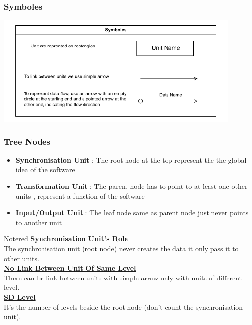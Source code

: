 \subsubsection*{Symboles}

\begin{center}
\includegraphics[width=0.9\textwidth]{Chapters/Diagram/SD/smb.drawio.pdf}
\end{center}

\vspace{0.5cm}

\subsubsection*{Tree Nodes}
\begin{itemize}
    \item \textbf{Synchronisation Unit} : The root node at the top represent the the global idea of the software 
    \item \textbf{Transformation Unit} : The parent node has to point to at least one other units , represent a function of the software
    \item \textbf{Input/Output Unit} : The leaf node same as parent node just never points to another unit
\end{itemize}

\vspace{0.5cm}

\begin{prettyBox}{Note}{red}
\textbf{\underline{Synchronisation Unit's Role}}\\[0.15cm]
The synchronisation unit (root node) never creates the data it only pass it to other units.\\[0.25cm]
\textbf{\underline{No Link Between Unit Of Same Level}}\\[0.15cm]
There can be link between units with simple arrow only with units of different level.\\[0.25cm]
\textbf{\underline{SD Level}}\\[0.15cm]
It's the number of levels beside the root node (don't count the synchronisation unit).
\end{prettyBox}

